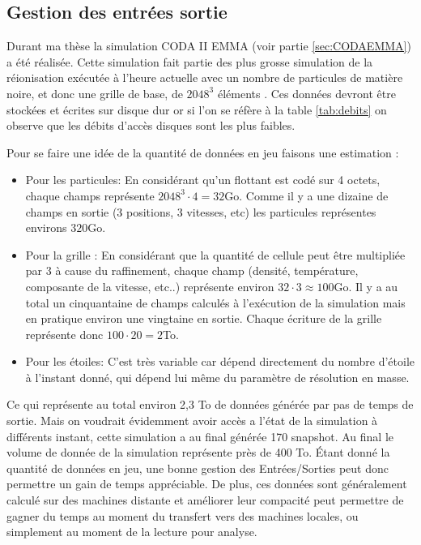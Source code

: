 \subsection{Gestion des entrées sortie}

Durant ma thèse la simulation CODA II EMMA (voir partie \ref{sec:CODAEMMA}) a été réalisée.
Cette simulation fait partie des plus grosse simulation de la réionisation exécutée à l'heure actuelle avec un nombre de particules de matière noire, et donc une grille de base, de $2048^3$ éléments .
Ces données devront être stockées et écrites sur disque dur or si l'on se réfère à la table \ref{tab:debits} on observe que les débits d'accès disques sont les plus faibles.

Pour se faire une idée de la quantité de données en jeu faisons une estimation : 

\begin{itemize}
\item Pour les particules:
En considérant qu'un flottant est codé sur 4 octets, chaque champs représente $2048^3 \cdot 4 = 32$Go.
Comme il y a une dizaine de champs en sortie (3 positions, 3 vitesses, etc) les particules représentes environs $320$Go.

\item Pour la grille :
En considérant que la quantité de cellule peut être multipliée par 3 à cause du raffinement, chaque champ (densité, température, composante de la vitesse, etc..) représente environ $32 \cdot 3 \approx 100$Go.
Il y a au total un cinquantaine de champs calculés à l'exécution de la simulation mais en pratique environ une vingtaine en sortie.
Chaque écriture de la grille représente donc $100\cdot 20 =2$To.

\item Pour les étoiles:
C'est très variable car dépend directement du nombre d'étoile à l'instant donné, qui dépend lui même du paramètre de résolution en masse.
\end{itemize}

Ce qui représente au total environ 2,3 To de données générée par pas de temps de sortie.
Mais on voudrait évidemment avoir accès a l'état de la simulation à différents instant, cette simulation a au final générée 170 snapshot.
Au final le volume de donnée de la simulation représente près de 400 To.
Étant donné la quantité de données en jeu, une bonne gestion des Entrées/Sorties peut donc permettre un gain de temps appréciable.
De plus, ces données sont généralement calculé sur des machines distante et améliorer leur compacité peut permettre de gagner du temps au moment du transfert vers des machines locales, ou simplement au moment de la lecture pour analyse.


